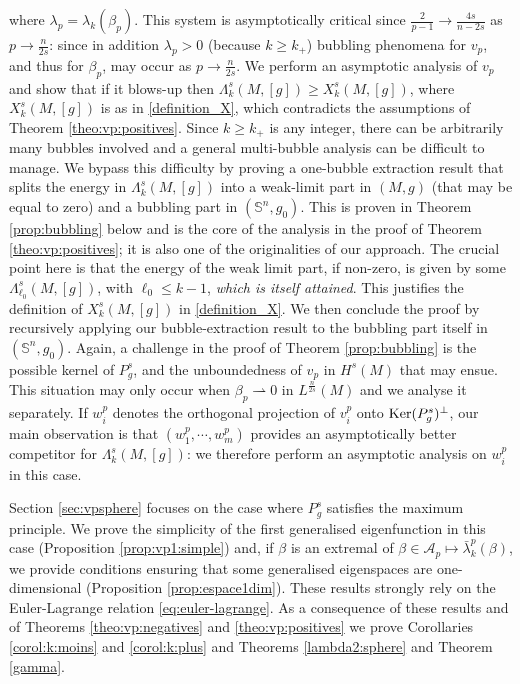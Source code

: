 \documentclass[10pt]{amsart}
\numberwithin{equation}{section}
\def\ker{{\mathop{\rm Ker}}}
\theoremstyle{plain}
\theoremstyle{remark}
\begin{document}
where $\lambda_p = \lambda_k(\beta_p)$. This system is asymptotically critical since $\frac{2}{p-1} \to \frac{4s}{n-2s}$ as $p \to \frac{n}{2s}$: since in addition $\lambda_p >0$ (because $k\geq k_+$) bubbling phenomena for $v_p$, and thus for $\beta_p$, may occur as $p \to \frac{n}{2s}$. We perform an asymptotic analysis of $v_p$ and show that if it blows-up then $\Lambda_k^s(M,[g]) \ge X_k^s(M,[g])$, where $X_k^s(M,[g])$ is as in \eqref{definition_X}, which contradicts the assumptions of Theorem  \ref{theo:vp:positives}. Since $k \ge k_+$ is any integer, there can be arbitrarily many bubbles involved and a general multi-bubble analysis can be difficult to manage. We bypass this difficulty by proving a one-bubble extraction result that splits the energy in $\Lambda_k^s(M,[g])$ into a weak-limit part in $(M,g)$ (that may be equal to zero) and a bubbling part in $(\mathbb{S}^n,g_0)$. This is proven in Theorem \ref{prop:bubbling} below and is the core of the analysis in the proof of Theorem \ref{theo:vp:positives}; it is also one of the originalities of our approach. The crucial point here is that the energy of the weak limit part, if non-zero, is given by some $\Lambda_{\ell_0}^s(M,[g])$, with $\ell_0 \le k-1$, \emph{which is itself attained}. This justifies the definition of  $X_k^s(M,[g])$ in \eqref{definition_X}. We then conclude the proof by recursively applying our bubble-extraction result to the bubbling part itself in $(\mathbb{S}^n,g_0)$. Again, a challenge in the proof of Theorem \ref{prop:bubbling} is the possible kernel of $P_g^s$, and the unboundedness of $v_p$ in $H^s(M)$ that may ensue. This situation may only occur when $\beta_p \rightharpoonup 0 $ in $L^{\frac{n}{2s}}(M)$ and we analyse it separately. If $w_i^p$ denotes the orthogonal projection of $v_i^p$ onto $\ker(P_g^s)^\perp$, our main observation is that $(w_1^p, \cdots, w_m^p)$ provides an asymptotically better competitor for $\Lambda_k^s(M,[g])$: we therefore perform an asymptotic analysis on $w_i^p$ in this case. 

\medskip


Section \ref{sec:vpsphere} focuses on the case where $P_g^s$ satisfies the maximum principle. We prove the simplicity of the first generalised eigenfunction in this case (Proposition \ref{prop:vp1:simple}) and, if $\beta$ is an extremal of $\beta \in \mathcal{A}_p \mapsto \bar{\lambda}_k^p(\beta)$, we provide conditions ensuring that some generalised eigenspaces are one-dimensional (Proposition \ref{prop:espace1dim}). These results strongly rely on the Euler-Lagrange relation \eqref{eq:euler-lagrange}. As a consequence of these results and of Theorems  \ref{theo:vp:negatives} and \ref{theo:vp:positives} we prove Corollaries \ref{corol:k:moins} and \ref{corol:k:plus} and 
 Theorems \ref{lambda2:sphere} and Theorem \ref{gamma}. 
\end{document}
